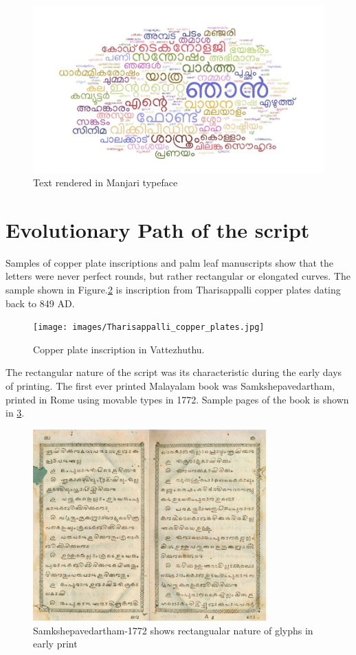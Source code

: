 \documentclass[10pt]{article}
\begin{document}
\begin{figure}[h!]
	\centering
	\includegraphics[width=\textwidth]{images/wordcloud.jpg}
	\caption{Text rendered in Manjari typeface}
	\label{wordcloud}
\end{figure} 

\section{Evolutionary Path of the script}

Samples of copper plate inscriptions and palm leaf manuscripts show that the letters were never perfect rounds, but rather rectangular or elongated curves. The sample shown in Figure.\ref{vattezhuthu} is inscription from Tharisappalli copper plates dating back to 849 AD.


\begin{figure}[h!]
	\centering
	\texttt{[image: images/Tharisappalli\_copper\_plates.jpg]}
	\caption{Copper plate inscription in Vattezhuthu.}
	\label{vattezhuthu}
\end{figure} 


The rectangular nature of the script was its characteristic during the early days of printing. The first ever printed Malayalam book was Samkshepavedartham, printed in Rome using movable types in 1772. Sample pages of the book is shown in \ref{Samkshepam}. 



\begin{figure}[h!]
	\centering
	\includegraphics[width=0.8\textwidth]{images/samkshepavedartham1772.png}
	\caption{Samkshepavedartham-1772 shows rectangualar nature of glyphs in early print}
	\label{Samkshepam}
\end{figure} 
\end{document}
